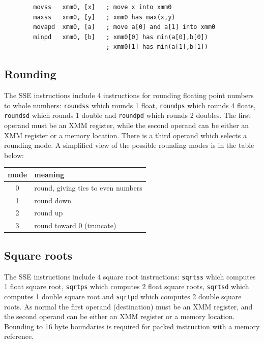 \documentclass[11pt,b5paper]{book}
\begin{document}
\begin{verbatim}
        movss   xmm0, [x]   ; move x into xmm0
        maxss   xmm0, [y]   ; xmm0 has max(x,y)
        movapd  xmm0, [a]   ; move a[0] and a[1] into xmm0
        minpd   xmm0, [b]   ; xmm0[0] has min(a[0],b[0])
                            ; xmm0[1] has min(a[1],b[1])
\end{verbatim}



\subsection{Rounding}

The SSE instructions include 4 instructions for rounding floating point numbers to whole numbers:
{\tt roundss} which rounds 1 float, {\tt roundps} which rounds 4 floats,
{\tt roundsd} which rounds 1 double and {\tt roundpd} which rounds 2 doubles.
The first operand must be an XMM register, while the second operand can be either an XMM register or
a memory location.
There is a third operand which selects a rounding mode.
A simplified view of the possible rounding modes is in the table below:

\begin{center}
    \begin{tabular}{|c|l|}
        \hline
        mode & meaning \\
        \hline
        0    & round, giving ties to even numbers \\
        \hline
        1    & round down \\
        \hline
        2    & round up \\
        \hline
        3    & round toward 0 (truncate) \\
        \hline
    \end{tabular}
\end{center}


\subsection{Square roots}

The SSE instructions include 4 square root instructions:
{\tt sqrtss} which computes 1 float square root,
{\tt sqrtps} which computes 2 float square roots,
{\tt sqrtsd} which computes 1 double square root
and {\tt sqrtpd} which computes 2 double square roots.
As normal the first operand (destination) must be an XMM register, and the second operand can be either
an XMM register or a memory location.
Bounding to 16 byte boundaries is required for packed instruction with a memory reference.
\end{document}
